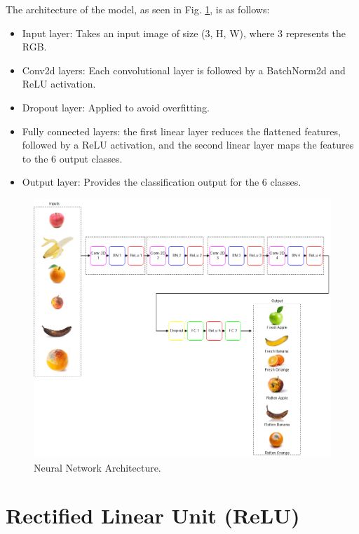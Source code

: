 \documentclass[conference]{IEEEtran}
\begin{document}
The architecture of the model, as seen in Fig. \ref{fig2}, is as follows:
\begin{itemize}
    \item Input layer: Takes an input image of size (3, H, W), where 3 represents the RGB.
    \item Conv2d layers: Each convolutional layer is followed by a BatchNorm2d and ReLU activation.
    \item Dropout layer: Applied to avoid overfitting.
    \item Fully connected layers: the first linear layer reduces the flattened features, followed by a ReLU activation, and the second linear layer maps the features to the 6 output classes.
    \item Output layer: Provides the classification output for the 6 classes.
\end{itemize}

\begin{figure}[h]
    \centering
    \includegraphics[width=\linewidth]{Ai_Prent.drawio_1_1.png}
    \caption{Neural Network Architecture.}
    \label{fig2}
\end{figure}

\section{Rectified Linear Unit (ReLU)}
\end{document}
